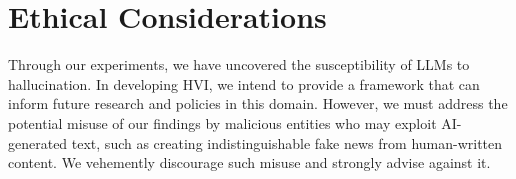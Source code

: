 \section{Ethical Considerations}
Through our experiments, we have uncovered the susceptibility of LLMs to hallucination. In developing HVI, we intend to provide a framework that can inform future research and policies in this domain. However, we must address the potential misuse of our findings by malicious entities who may exploit AI-generated text, such as creating indistinguishable fake news from human-written content. We vehemently discourage such misuse and strongly advise against it.






